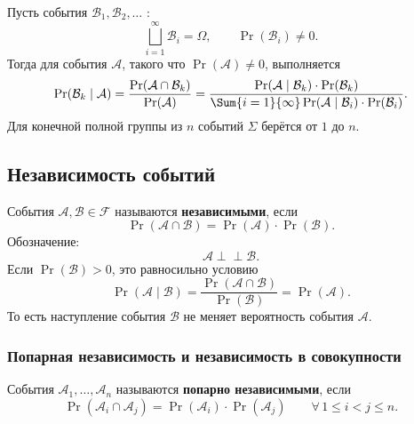 \begin{theorem}
    Пусть события $\mathcal{B}_1,\mathcal{B}_2,\dots$
    :
    \[
        \bigsqcup_{i=1}^{\infty} \mathcal{B}_i = \Omega,
        \qquad
        \Pr(\mathcal{B}_i) \neq 0.
    \]
    Тогда для события $\mathcal{A}$, такого что
    $\Pr(\mathcal{A}) \neq 0$, выполняется
    \[
        \Pr(\mathcal{B}_k \mid \mathcal{A})
        =
        \frac{\Pr(\mathcal{A} \cap \mathcal{B}_k)}
             {\Pr(\mathcal{A})}
        =
        \frac{
            \Pr(\mathcal{A} \mid \mathcal{B}_k)
            \cdot \Pr(\mathcal{B}_k)
        }{
            \Sum{i=1}{\infty}
            \Pr(\mathcal{A} \mid \mathcal{B}_i)
            \cdot \Pr(\mathcal{B}_i)
        }.
    \]
    Для конечной полной группы из $n$ событий
    $\Sigma$ берётся от $1$ до $n$.
\end{theorem}

\subsection{Независимость событий}

\begin{definition}
    События $\mathcal{A}, \mathcal{B} \in \mathcal{F}$
    называются \textbf{независимыми}, если
    \[
        \Pr(\mathcal{A} \cap \mathcal{B})
        =
        \Pr(\mathcal{A}) \cdot \Pr(\mathcal{B}).
    \]
    Обозначение:
    \[
        \mathcal{A} \perp\!\!\!\perp \mathcal{B}.
    \]
    Если $\Pr(\mathcal{B}) > 0$, это равносильно условию
    \[
        \Pr(\mathcal{A} \mid \mathcal{B})
        =
        \frac{\Pr(\mathcal{A} \cap \mathcal{B})}{\Pr(\mathcal{B})}
        =
        \Pr(\mathcal{A}).
    \]
    То есть наступление события $\mathcal{B}$ не меняет
    вероятность события $\mathcal{A}$.
\end{definition}

\subsubsection{Попарная независимость и независимость в совокупности}

\begin{definition}
    События $\mathcal{A}_1,\dots,\mathcal{A}_n$
    называются \textbf{попарно независимыми}, если
    \[
        \Pr(\mathcal{A}_i \cap \mathcal{A}_j)
        =
        \Pr(\mathcal{A}_i)\cdot\Pr(\mathcal{A}_j)
        \qquad
        \forall\,1 \leq i < j \leq n.
    \]
\end{definition}





